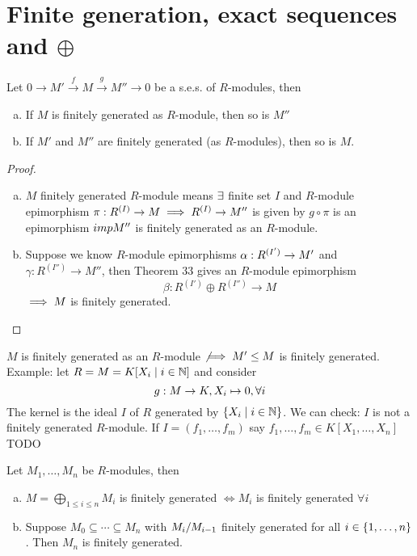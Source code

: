 \documentclass[a4paper]{report}
\begin{document}
\section{Finite generation, exact sequences and $\oplus$}
\begin{cor}
  Let $0 \to M' \xrightarrow f M \xrightarrow g M'' \to 0$ be a s.e.s. of $R$-modules, then
  \begin{enumerate}[(a)]
    \item If $M$ is finitely generated as $R$-module, then so is $M''$
    \item If $M'$ and $M''$ are finitely generated (as $R$-modules), then so is $M$.
  \end{enumerate}
\end{cor}
\begin{proof}
\begin{enumerate}[(a)]
  \item $M$ finitely generated $R$-module means $\exists$ finite set $I$ and $R$-module epimorphism $\pi: R^{(I)} \to M \implies R^{(I)} \to M''$ is given by $g \circ \pi$ is an epimorphism $\\imp M''$ is finitely generated as an $R$-module.
  \item Suppose we know $R$-module epimorphisms $\alpha: R^{(I')} \to M'$ and $\gamma: R^{(I'')} \to M''$, then Theorem 33 gives an $R$-module epimorphism \[\beta: R^{(I')} \oplus R^{(I'')} \to M\]
        $\implies M$ is finitely generated. \qedhere
\end{enumerate}
\end{proof}

\begin{rem*}
  $M$ is finitely generated as an $R$-module $\not \implies M' \le M$ is finitely generated. Example:
  let $R = M = K[X_{i} \mid i \in \mathbb{N}]$ and consider \[g: M \to K, X_{i} \mapsto 0, \forall i\]
  The kernel is the ideal $I$ of $R$ generated by $\{X_{i} \mid i \in \mathbb{N}\}$. We can check: $I$ is not a finitely generated $R$-module. If $I = (f_{1}, \ldots, f_{m})$ say $f_{1}, \ldots, f_{m} \in K[X_{1}, \ldots, X_{n}]$ TODO
\end{rem*}

\begin{cor}[exer]
  Let $M_{1}, \ldots, M_{n}$ be $R$-modules, then
  \begin{enumerate}[(a)]
    \item $M = \bigoplus_{1 \le i \le n}M_{i}$ is finitely generated $\iff M_{i}$ is finitely generated $\forall i$
          \item Suppose $M_{0} \subseteq \cdots \subseteq M_{n}$ with $\fak {M_{i}}{M_{i-1}}$ finitely generated for all $i \in \{1, \ldots, n\}$. Then $M_{n}$ is finitely generated.
  \end{enumerate}
\end{cor}
\end{document}
